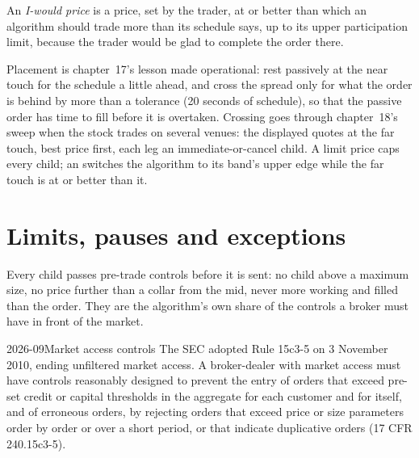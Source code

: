 \begin{definition}\label{def:mx:build-an-execution-algorithm:iwould}
An \emph{I-would price} is a price, set by the trader, at or better than which an algorithm should trade more than its schedule
says, up to its upper participation limit, because the trader would be glad to complete the order there.
\end{definition}

Placement is chapter~17's lesson made operational: rest passively at the near touch for the schedule a little ahead, and cross the spread only for what
the order is behind by more than a tolerance (20 seconds of schedule), so that the passive order has time to fill before it is overtaken. Crossing goes
through chapter~18's sweep when the stock trades on several venues: the displayed quotes at the far touch, best price first, each leg an
immediate-or-cancel child. A limit price caps every child; an  switches the algorithm to its band's upper edge while the far touch is at or
better than it.

\label{lst:mx:build-an-execution-algorithm:check}

\section{Limits, pauses and exceptions}

Every child passes pre-trade controls before it is sent: no child above a maximum size, no price further than a collar from the mid, never more working
and filled than the order. They are the algorithm's own share of the controls a broker must have in front of the market.

\begin{dated}{2026-09}{Market access controls}\label{dat:mx:build-an-execution-algorithm:access}
The SEC adopted Rule 15c3-5 on 3 November 2010, ending unfiltered market access. A broker-dealer with market access must have controls reasonably
designed to prevent the entry of orders that exceed pre-set credit or capital thresholds in the aggregate for each customer and for itself, and of
erroneous orders, by rejecting orders that exceed price or size parameters order by order or over a short period, or that indicate duplicative
orders (17 CFR 240.15c3-5).
\end{dated}

